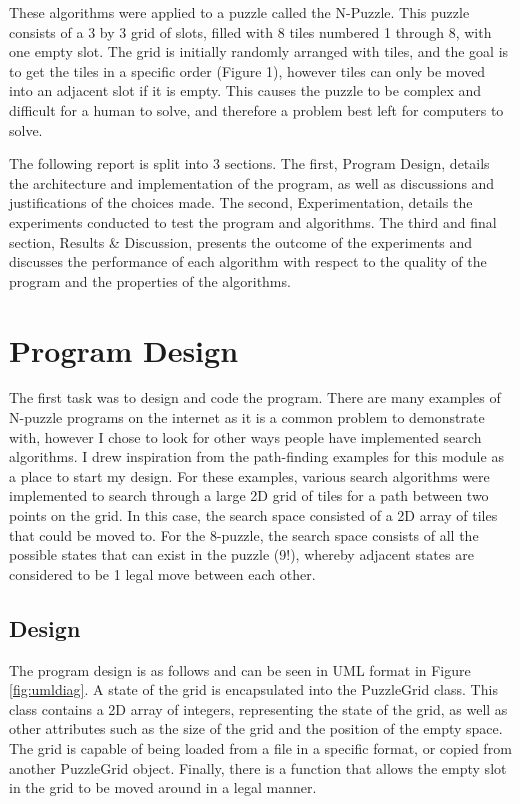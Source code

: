\documentclass[12pt]{article}
\begin{document}
These algorithms were applied to a puzzle called the N-Puzzle. This puzzle consists of a 3 by 3 grid of slots, filled with 8 tiles numbered 1 through 8, with one empty slot. The grid is initially randomly arranged with tiles, and the goal is to get the tiles in a specific order (Figure 1), however tiles can only be moved into an adjacent slot if it is empty. This causes the puzzle to be complex and difficult for a human to solve, and therefore a problem best left for computers to solve.

The following report is split into 3 sections. The first, Program Design, details the architecture and implementation of the program, as well as discussions and justifications of the choices made. The second, Experimentation, details the experiments conducted to test the program and algorithms. The third and final section, Results \& Discussion, presents the outcome of the experiments and discusses the performance of each algorithm with respect to the quality of the program and the properties of the algorithms.

\section{Program Design}
The first task was to design and code the program. There are many examples of N-puzzle programs on the internet as it is a common problem to demonstrate with, however I chose to look for other ways people have implemented search algorithms. I drew inspiration from the path-finding examples for this module as a place to start my design. For these examples, various search algorithms were implemented to search through a large 2D grid of tiles for a path between two points on the grid. In this case, the search space consisted of a 2D array of tiles that could be moved to. For the 8-puzzle, the search space consists of all the possible states that can exist in the puzzle (9!), whereby adjacent states are considered to be 1 legal move between each other.

\subsection{Design}
The program design is as follows and can be seen in UML format in Figure \ref{fig:umldiag}. A state of the grid is encapsulated into the PuzzleGrid class. This class contains a 2D array of integers, representing the state of the grid, as well as other attributes such as the size of the grid and the position of the empty space. The grid is capable of being loaded from a file in a specific format, or copied from another PuzzleGrid object. Finally, there is a function that allows the empty slot in the grid to be moved around in a legal manner.
\end{document}
